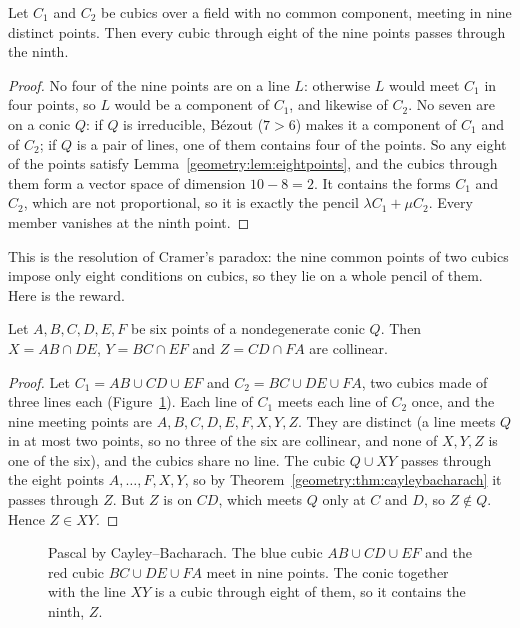 \begin{theorem}\label{geometry:thm:cayleybacharach}
Let $C_1$ and $C_2$ be cubics over a field with no common component, meeting in nine distinct points. Then every cubic through eight of the
nine points passes through the ninth.
\end{theorem}

\begin{proof}
No four of the nine points are on a line $L$: otherwise $L$ would meet $C_1$ in four points, so $L$ would be a component of $C_1$, and likewise of $C_2$.
No seven are on a conic $Q$: if $Q$ is irreducible, B\'ezout ($7>6$) makes it a component of $C_1$ and of $C_2$; if $Q$ is a pair of lines, one of them
contains four of the points. So any eight of the points satisfy Lemma~\ref{geometry:lem:eightpoints}, and the cubics through them form a vector space of dimension
$10-8=2$. It contains the forms $C_1$ and $C_2$, which are not proportional, so it is exactly the pencil $\lambda C_1+\mu C_2$. Every member vanishes at the ninth
point.
\end{proof}

This is the resolution of Cramer's paradox: the nine common points of two cubics impose only eight conditions on cubics, so they lie on a whole pencil of
them. Here is the reward.

\begin{corollary}\label{geometry:cor:pascalcb}
Let $A,B,C,D,E,F$ be six points of a nondegenerate conic $Q$. Then $X=AB\cap DE$, $Y=BC\cap EF$ and $Z=CD\cap FA$ are collinear.
\end{corollary}

\begin{proof}
Let $C_1=AB\cup CD\cup EF$ and $C_2=BC\cup DE\cup FA$, two cubics made of three lines each (Figure~\ref{geometry:fig:pascalcb}). Each line of $C_1$ meets each line of
$C_2$ once, and the nine meeting points are $A,B,C,D,E,F,X,Y,Z$. They are distinct (a line meets $Q$ in at most two points, so no three of the six are
collinear, and none of $X,Y,Z$ is one of the six), and the cubics share no line. The cubic $Q\cup XY$ passes through the eight points $A,\dots,F,X,Y$, so by
Theorem~\ref{geometry:thm:cayleybacharach} it passes through $Z$. But $Z$ is on $CD$, which meets $Q$ only at $C$ and $D$, so $Z\notin Q$. Hence $Z\in XY$.
\end{proof}

\begin{figure}[ht]
\centering
{}
\caption{Pascal by Cayley--Bacharach. The blue cubic $AB\cup CD\cup EF$ and the red cubic $BC\cup DE\cup FA$ meet in nine points. The conic together with the
line $XY$ is a cubic through eight of them, so it contains the ninth, $Z$.}
\label{geometry:fig:pascalcb}
\end{figure}

